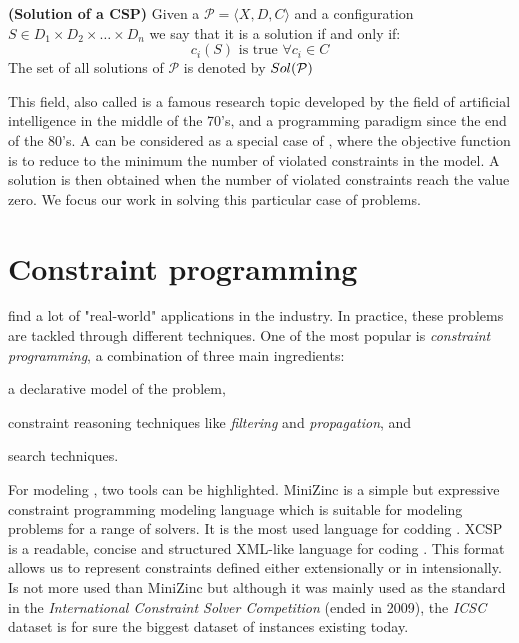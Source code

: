 \begin{definition}{\bf (Solution of a CSP)}
\label{solCSP}
Given a \csp{} $\mathcal{P}=\langle X,D,C \rangle$ and a configuration $S \in D_1\times D_2\times\dots\times D_n$ we say that it is a solution if and only if:	
\begin{equation*}
c_i\left(S\right)\text{ is true }\forall c_i \in C
\end{equation*}
The set of all solutions of $\mathcal{P}$ is denoted by $\mathnormal{Sol}(\mathcal{P})$
\end{definition}

This field, also called \CP{} is a famous research topic developed by the field of artificial intelligence in the middle of the 70's, and a programming paradigm since the end of the 80's. A \csp{} can be considered as a special case of \COPs, where the objective function is to reduce to the minimum the number of violated constraints in the model. A solution is then obtained when the number of violated constraints reach the value zero. We focus our work in solving this particular case of problems.

\section{Constraint programming}\label{sec:cp}

\csps{} find a lot of "real-world" applications in the industry. In practice, these problems are tackled through different techniques. One of the most popular is \textit{constraint programming}, a combination of three main ingredients: \begin{inparaenum}[i)] \item a declarative model of the problem, \item constraint reasoning techniques like \textit{filtering} and \textit{propagation}, and \item search techniques. \end{inparaenum} 

 For modeling \csps{}, two tools can be highlighted. {\sc MiniZinc} is a simple but expressive constraint programming modeling language which is suitable for modeling problems for a range of solvers. It is the most used language for codding \csps{} \cite{Nethercote}. {\sc XCSP} is a readable, concise and structured XML-like language for coding \csps. This format allows us to represent constraints defined either extensionally or in intensionally. Is not more used than {\sc MiniZinc} but although it was mainly used as the standard in the {\it International Constraint Solver Competition} (ended in 2009), the {\it ICSC} dataset is for sure the biggest dataset of \csps{} instances existing today.

